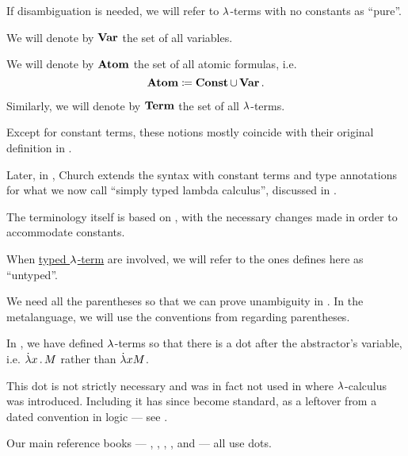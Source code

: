 \begin{definition}
\begin{thmenum}
    If disambiguation is needed, we will refer to \( {\mathrm \lambda} \)-terms with no constants as \enquote{pure}.

     We will denote by \( \op*{Var} \) the set of all variables.

     We will denote by \( \op*{Atom} \) the set of all atomic formulas, i.e.
    \begin{equation*}
      \op*{Atom} \coloneqq \op*{Const} \cup \op*{Var}.
    \end{equation*}

     Similarly, we will denote by \( \op*{Term} \) the set of all \( {\mathrm \lambda} \)-terms.
  \end{thmenum}
\end{definition}
\begin{comments}
  \item Except for constant terms, these notions mostly coincide with their original definition in \cite[352]{Church1932LambdaCalculus}.

  Later, in \cite[56]{Church1940STT}, Church extends the syntax with constant terms and type annotations for what we now call \enquote{simply typed lambda calculus}, discussed in .

  The terminology itself is based on \cite[def. 1A1]{Hindley1997BasicSTT}, with the necessary changes made in order to accommodate constants.

  \item When \hyperref[def:typed_lambda_term]{typed \( {\mathrm \lambda} \)-term} are involved, we will refer to the ones defines here as \enquote{untyped}.

  \item We need all the parentheses so that we can prove unambiguity in . In the metalanguage, we will use the conventions from  regarding parentheses.
\end{comments}

\begin{remark}\label{rem:lambda_term_abstractor_dot}
  In , we have defined \( {\mathrm \lambda} \)-terms so that there is a dot after the abstractor's variable, i.e. \( \qabs x M \) rather than \( \mathord{\dot{{\mathrm \lambda}}} x M \).

  This dot is not strictly necessary and was in fact not used in  where \( {\mathrm \lambda} \)-calculus was introduced. Including it has since become standard, as a leftover from a dated convention in logic --- see .

  Our main reference books --- \cite[def. 1A1]{Hindley1997BasicSTT}, \cite[22]{Barendregt1984LambdaCalculus}, \cite[15]{GirardEtAl1989ProofsAndTypes}, \cite[\S A.2.4]{UnivalentFoundationsProgram2024OctoberHoTT}, \cite[\S 4.1.3]{Mimram2020ProgramEqualsProof} and \cite[188]{Герасимов2011Вычислимость} --- all use dots.
\end{remark}

